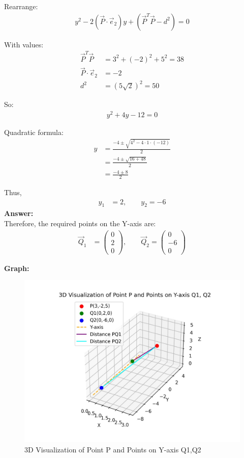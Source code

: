 \documentclass{article}
\begin{document}
Rearrange:
\begin{align}
y^2 - 2(\vec{P} \cdot \vec{e}_2) y + (\vec{P}^T \vec{P} - d^2) = 0
\end{align}

With values:
\begin{align}
\vec{P}^T \vec{P} &= 3^2 + (-2)^2 + 5^2 = 38 \\
\vec{P} \cdot \vec{e}_2 &= -2 \\
d^2 &= (5\sqrt{2})^2 = 50
\end{align}

So:
\begin{align}
y^2 + 4y - 12 = 0
\end{align}

Quadratic formula:
\begin{align}
y &= \frac{-4 \pm \sqrt{4^2 - 4 \cdot 1 \cdot (-12)}}{2} \\
  &= \frac{-4 \pm \sqrt{16 + 48}}{2} \\
  &= \frac{-4 \pm 8}{2}
\end{align}

Thus,
\begin{align}
y_1 &= 2, \qquad y_2 = -6
\end{align}
\vspace{2mm}
\textbf{Answer:}
\\

Therefore, the required points on the Y-axis are:
\begin{align}
\vec{Q}_1 &= \begin{pmatrix} 0 \\ 2 \\ 0 \end{pmatrix}, \qquad
\vec{Q}_2 = \begin{pmatrix} 0 \\ -6 \\ 0 \end{pmatrix}
\end{align}


\textbf{Graph:}
\begin{figure}[H]
	\centering
	\includegraphics[width=0.8\columnwidth]{FIG/graph.png}
	\caption{3D Visualization of Point P and Points on Y-axis Q1,Q2}
	\label{img}
\end{figure}
\end{document}

